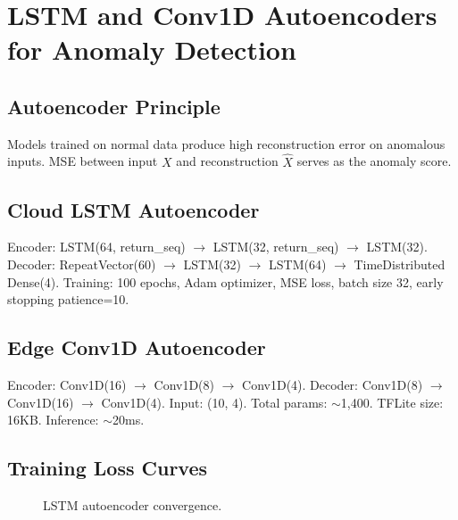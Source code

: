 \section{LSTM and Conv1D Autoencoders for Anomaly Detection}

\subsection{Autoencoder Principle}
Models trained on normal data produce high reconstruction error on anomalous inputs. MSE between input $X$ and reconstruction $\hat{X}$ serves as the anomaly score.

\subsection{Cloud LSTM Autoencoder}
Encoder: LSTM(64, return\_seq) $\rightarrow$ LSTM(32, return\_seq) $\rightarrow$ LSTM(32). Decoder: RepeatVector(60) $\rightarrow$ LSTM(32) $\rightarrow$ LSTM(64) $\rightarrow$ TimeDistributed Dense(4). Training: 100 epochs, Adam optimizer, MSE loss, batch size 32, early stopping patience=10.

\subsection{Edge Conv1D Autoencoder}
Encoder: Conv1D(16) $\rightarrow$ Conv1D(8) $\rightarrow$ Conv1D(4). Decoder: Conv1D(8) $\rightarrow$ Conv1D(16) $\rightarrow$ Conv1D(4). Input: (10, 4). Total params: $\sim$1,400. TFLite size: 16KB. Inference: $\sim$20ms.

\subsection{Training Loss Curves}

\begin{figure}[H]
\centering
{}
\caption{LSTM autoencoder convergence.}
\label{fig:lstm_loss}
\end{figure}

